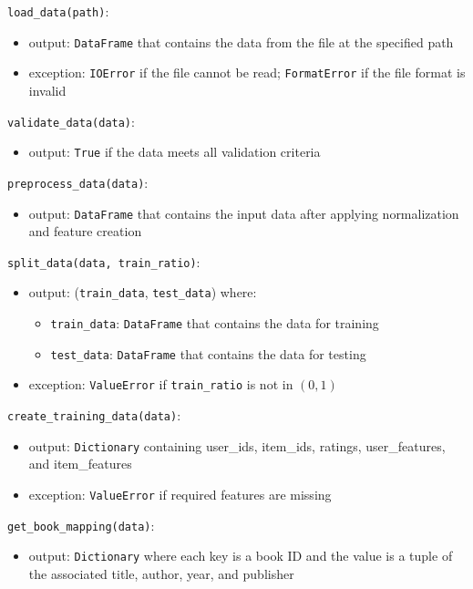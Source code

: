 \documentclass[12pt, titlepage]{article}
\begin{document}
\noindent \texttt{load\_data(path)}:
\begin{itemize}
\item output: \texttt{DataFrame} that contains the data from the file at the specified path
\item exception: \texttt{IOError} if the file cannot be read; \texttt{FormatError} if the file format is invalid
\end{itemize}

\noindent \texttt{validate\_data(data)}:
\begin{itemize}
\item output: \texttt{True} if the data meets all validation criteria
\end{itemize}

\noindent \texttt{preprocess\_data(data)}:
\begin{itemize}
\item output: \texttt{DataFrame} that contains the input data after applying normalization and feature creation
\end{itemize}

\noindent \texttt{split\_data(data, train\_ratio)}:
\begin{itemize}
\item output: (\texttt{train\_data}, \texttt{test\_data}) where:
\begin{itemize}
  \item \texttt{train\_data}: \texttt{DataFrame} that contains the data for training
  \item \texttt{test\_data}: \texttt{DataFrame} that contains the data for testing
\end{itemize}
\item exception: \texttt{ValueError} if \texttt{train\_ratio} is not in $(0,1)$
\end{itemize}

\noindent \texttt{create\_training\_data(data)}:
\begin{itemize}
\item output: \texttt{Dictionary} containing user\_ids, item\_ids, ratings, user\_features, and item\_features
\item exception: \texttt{ValueError} if required features are missing
\end{itemize}

\noindent \texttt{get\_book\_mapping(data)}:
\begin{itemize}
\item output: \texttt{Dictionary} where each key is a book ID and the value is a tuple of the associated title, author, year, and publisher
\end{itemize}
\end{document}
